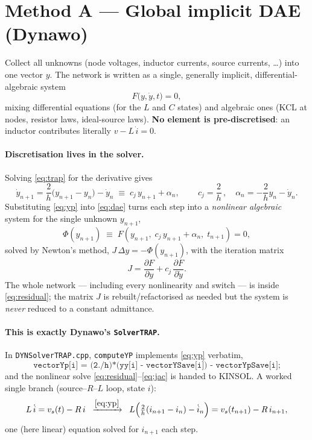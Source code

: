 \documentclass[11pt]{article}
\newcommand{\hstep}{h}
\begin{document}
\section{Method A --- Global implicit DAE (Dynawo)}

Collect all unknowns (node voltages, inductor currents, source currents, \dots)
into one vector $y$. The network is written as a single, generally implicit,
differential-algebraic system
\begin{equation}
F\big(y,\dot y,t\big) = 0,
\label{eq:dae}
\end{equation}
mixing differential equations (for the $L$ and $C$ states) and algebraic ones
(KCL at nodes, resistor laws, ideal-source laws). \textbf{No element is
pre-discretised}: an inductor contributes literally $v - L\,\dot i = 0$.

\paragraph{Discretisation lives in the solver.}
Solving \eqref{eq:trap} for the derivative gives
\begin{equation}
\dot y_{n+1} = \frac{2}{\hstep}\big(y_{n+1}-y_n\big) - \dot y_n
\;\equiv\; c_j\,y_{n+1} + \alpha_n,
\qquad
\boxed{\,c_j = \dfrac{2}{\hstep}\,},\quad
\alpha_n = -\frac{2}{\hstep}y_n-\dot y_n .
\label{eq:yp}
\end{equation}
Substituting \eqref{eq:yp} into \eqref{eq:dae} turns each step into a
\emph{nonlinear algebraic} system for the single unknown $y_{n+1}$,
\begin{equation}
\Phi(y_{n+1}) \;\equiv\;
F\!\left(y_{n+1},\; c_j\,y_{n+1}+\alpha_n,\; t_{n+1}\right) = 0,
\label{eq:residual}
\end{equation}
solved by Newton's method, $J\,\Delta y = -\Phi(y_{n+1})$, with the iteration
matrix
\begin{equation}
J = \frac{\partial F}{\partial y} + c_j\,\frac{\partial F}{\partial \dot y}.
\label{eq:jac}
\end{equation}
The whole network --- including every nonlinearity and switch --- is inside
\eqref{eq:residual}; the matrix $J$ is rebuilt/refactorised as needed but the
system is \emph{never} reduced to a constant admittance.

\paragraph{This is exactly Dynawo's \texttt{SolverTRAP}.}
In \texttt{DYNSolverTRAP.cpp}, \texttt{computeYP} implements \eqref{eq:yp}
verbatim,
\[
\texttt{vectorYp[i] = (2./h)*(yy[i] - vectorYSave[i]) - vectorYpSave[i];}
\]
and the nonlinear solve \eqref{eq:residual}--\eqref{eq:jac} is handed to KINSOL.
A worked single branch (source--$R$--$L$ loop, state $i$):
\begin{equation}
L\,\dot i = v_s(t) - R\,i
\;\;\xrightarrow{\eqref{eq:yp}}\;\;
L\Big(\tfrac{2}{\hstep}(i_{n+1}-i_n)-\dot i_n\Big) = v_s(t_{n+1}) - R\,i_{n+1},
\label{eq:Aexample}
\end{equation}
one (here linear) equation solved for $i_{n+1}$ each step.
\end{document}
